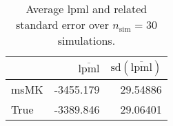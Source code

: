 \begin{table}[H]

\caption{Average lpml and related standard error over $n_{\text{sim}} = 30$ simulations.}
\centering
\begin{tabular}[t]{lrr}
\toprule
  & $\overbar{\text{lpml}}$ & $\text{sd}(\overbar{\text{lpml}})$\\
\midrule
msMK & -3455.179 & 29.54886\\
True & -3389.846 & 29.06401\\
\bottomrule
\end{tabular}
\end{table}